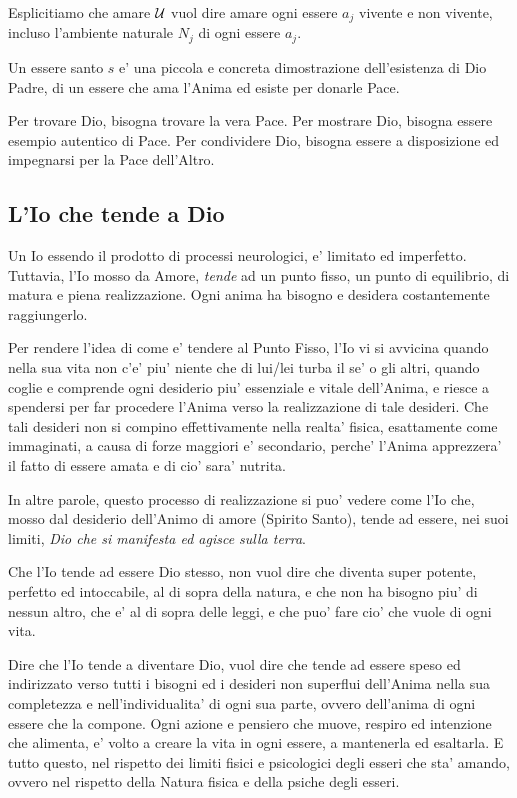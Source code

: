 Esplicitiamo che amare $\mathcal{U}$ vuol dire amare ogni essere $a_j$ vivente e non vivente, incluso l'ambiente naturale $N_j$ di ogni essere $a_j$. 

Un essere santo $s$ e' una piccola e concreta dimostrazione dell'esistenza di Dio Padre, di un essere che ama l'Anima ed esiste per donarle Pace. 

Per trovare Dio, bisogna trovare la vera Pace. Per mostrare Dio, bisogna essere esempio autentico di Pace. Per condividere Dio, bisogna essere a disposizione ed impegnarsi per la Pace dell'Altro.


\subsection{L'Io che tende a Dio}
\label{definizioneAnimo}

Un Io essendo il prodotto di processi neurologici, e' limitato ed imperfetto. Tuttavia, l'Io mosso da Amore, \emph{tende} ad un punto fisso, un punto di equilibrio, di matura e piena realizzazione. Ogni anima ha bisogno e desidera costantemente raggiungerlo. 

Per rendere l'idea di come e' tendere al Punto Fisso, l'Io vi si avvicina quando nella sua vita non c'e' piu' niente che di lui/lei turba il se' o gli altri, quando coglie e comprende ogni desiderio piu' essenziale e vitale dell'Anima, e riesce a spendersi per far procedere l'Anima verso la realizzazione di tale desideri. Che tali desideri non si compino effettivamente nella realta' fisica, esattamente come immaginati, a causa di forze maggiori e' secondario, perche' l'Anima apprezzera' il fatto di essere amata e di cio' sara' nutrita.

In altre parole, questo processo di realizzazione si puo' vedere come l'Io che, mosso dal desiderio dell'Animo di amore (Spirito Santo), tende ad essere, nei suoi limiti, \emph{Dio che si manifesta ed agisce sulla terra}.

Che l'Io tende ad essere Dio stesso, non vuol dire che diventa super potente, perfetto ed intoccabile, al di sopra della natura, e che non ha bisogno piu' di nessun altro, che e' al di sopra delle leggi, e che puo' fare cio' che vuole di ogni vita. 

Dire che l'Io tende a diventare Dio, vuol dire che tende ad essere speso ed indirizzato verso tutti i bisogni ed i desideri non superflui dell'Anima nella sua completezza e nell'individualita' di ogni sua parte, ovvero dell'anima di ogni essere che la compone. Ogni azione e pensiero che muove, respiro ed intenzione che alimenta, e' volto a creare la vita in ogni essere, a mantenerla ed esaltarla. E tutto questo, nel rispetto dei limiti fisici e psicologici degli esseri che sta' amando, ovvero nel rispetto della Natura fisica e della psiche degli esseri.

